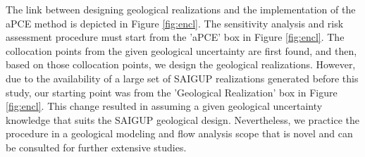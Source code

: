The link between designing geological realizations and the implementation of the aPCE method is depicted in Figure \ref{fig:encl}. The sensitivity analysis and risk assessment procedure must start from the ’aPCE’ box in Figure \ref{fig:encl}. The collocation points from the given geological uncertainty are first found, and then, based on those collocation points, we design the geological realizations. However, due to the availability of a large set of SAIGUP realizations generated before this study, our starting point was from the ’Geological Realization’ box in Figure \ref{fig:encl}. This change resulted in assuming a given geological uncertainty knowledge that suits the SAIGUP geological design. Nevertheless, we practice the procedure in a geological modeling and flow analysis scope that is novel and can be consulted for further extensive studies.
